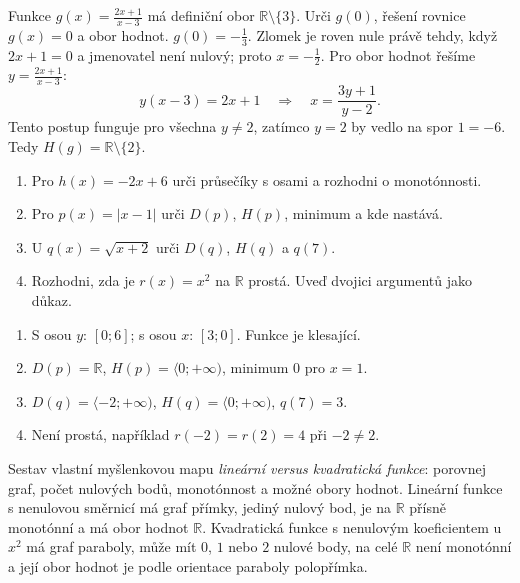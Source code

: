 \documentclass[11pt,a4paper]{article}
\begin{document}
\begin{prikladReseniBox}[title={Příklad 2}]
Funkce $g(x)=\frac{2x+1}{x-3}$ má definiční obor $\mathbb R\setminus\{3\}$. Urči $g(0)$, řešení rovnice $g(x)=0$ a obor hodnot.
\tcblower
$g(0)=-\frac13$. Zlomek je roven nule právě tehdy, když $2x+1=0$ a jmenovatel není nulový; proto $x=-\frac12$. Pro obor hodnot řešíme $y=\frac{2x+1}{x-3}$:
\[
y(x-3)=2x+1\quad\Longrightarrow\quad x=\frac{3y+1}{y-2}.
\]
Tento postup funguje pro všechna $y\ne2$, zatímco $y=2$ by vedlo na spor $1=-6$. Tedy $H(g)=\mathbb R\setminus\{2\}$.
\end{prikladReseniBox}

\begin{zadaniReseniBox}[title={Samostatná práce 1}]
\begin{enumerate}[label=\alph*)]
\item Pro $h(x)=-2x+6$ urči průsečíky s osami a rozhodni o monotónnosti.
\item Pro $p(x)=|x-1|$ urči $D(p)$, $H(p)$, minimum a kde nastává.
\item U $q(x)=\sqrt{x+2}$ urči $D(q)$, $H(q)$ a $q(7)$.
\item Rozhodni, zda je $r(x)=x^2$ na $\mathbb R$ prostá. Uveď dvojici argumentů jako důkaz.
\end{enumerate}
\tcblower
\begin{enumerate}[label=\alph*)]
\item S osou $y$: $[0;6]$; s osou $x$: $[3;0]$. Funkce je klesající.
\item $D(p)=\mathbb R$, $H(p)=\langle0;+\infty)$, minimum $0$ pro $x=1$.
\item $D(q)=\langle-2;+\infty)$, $H(q)=\langle0;+\infty)$, $q(7)=3$.
\item Není prostá, například $r(-2)=r(2)=4$ při $-2\ne2$.
\end{enumerate}
\end{zadaniReseniBox}

\begin{zadaniReseniBox}[title={Rozšíření 1}]
Sestav vlastní myšlenkovou mapu \emph{lineární versus kvadratická funkce}: porovnej graf, počet nulových bodů, monotónnost a možné obory hodnot.
\tcblower
Lineární funkce s nenulovou směrnicí má graf přímky, jediný nulový bod, je na $\mathbb R$ přísně monotónní a má obor hodnot $\mathbb R$. Kvadratická funkce s nenulovým koeficientem u $x^2$ má graf paraboly, může mít $0$, $1$ nebo $2$ nulové body, na celé $\mathbb R$ není monotónní a její obor hodnot je podle orientace paraboly polopřímka.
\end{zadaniReseniBox}
\end{document}
